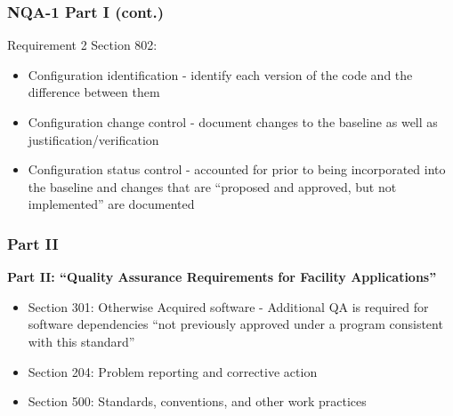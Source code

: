 \documentclass[12pt]{beamer}
\begin{document}
\begin{frame}
\frametitle{NQA-1 Part I (cont.)}

Requirement 2 Section 802:
\begin{itemize}
\item{\alert{Configuration identification} - identify each version of the code and the difference between them}
\item{\alert{Configuration change control} - document changes to the baseline as well as justification/verification}
\item{\alert{Configuration status control} - accounted for prior to being incorporated into the baseline and changes that are “proposed and approved, but not implemented” are documented \cite{add}}
\end{itemize}
\end{frame}
\begin{frame}
\frametitle{Part II}

{\bf Part II: ``Quality Assurance Requirements for Facility Applications''}

\begin{itemize}
\item{Section 301: \alert{Otherwise Acquired software} - Additional QA is required for software dependencies ``not previously approved under a program consistent with this standard''}
\item{Section 204: \alert{Problem reporting} and \alert{corrective action}}
\item{Section 500: \alert{Standards}, \alert{conventions}, and other \alert{work practices}}
\end{itemize}

\end{frame}
\end{document}
